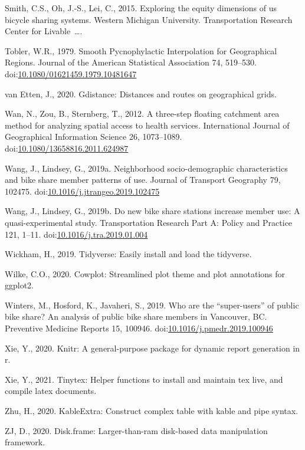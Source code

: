 \documentclass[]{elsarticle} %
\begin{document}
\leavevmode\hypertarget{ref-smith2015exploring}{}%
Smith, C.S., Oh, J.-S., Lei, C., 2015. Exploring the equity dimensions
of us bicycle sharing systems. Western Michigan University.
Transportation Research Center for Livable~\ldots.

\leavevmode\hypertarget{ref-toblerSmoothPycnophylacticInterpolation1979}{}%
Tobler, W.R., 1979. Smooth Pycnophylactic Interpolation for Geographical
Regions. Journal of the American Statistical Association 74, 519--530.
doi:\href{https://doi.org/10.1080/01621459.1979.10481647}{10.1080/01621459.1979.10481647}

\leavevmode\hypertarget{ref-R-gdistance}{}%
van Etten, J., 2020. Gdistance: Distances and routes on geographical
grids.

\leavevmode\hypertarget{ref-wanThreestepFloatingCatchment2012}{}%
Wan, N., Zou, B., Sternberg, T., 2012. A three-step floating catchment
area method for analyzing spatial access to health services.
International Journal of Geographical Information Science 26,
1073--1089.
doi:\href{https://doi.org/10.1080/13658816.2011.624987}{10.1080/13658816.2011.624987}

\leavevmode\hypertarget{ref-wangNeighborhoodSociodemographicCharacteristics2019}{}%
Wang, J., Lindsey, G., 2019a. Neighborhood socio-demographic
characteristics and bike share member patterns of use. Journal of
Transport Geography 79, 102475.
doi:\href{https://doi.org/10.1016/j.jtrangeo.2019.102475}{10.1016/j.jtrangeo.2019.102475}

\leavevmode\hypertarget{ref-wangNewBikeShare2019}{}%
Wang, J., Lindsey, G., 2019b. Do new bike share stations increase member
use: A quasi-experimental study. Transportation Research Part A: Policy
and Practice 121, 1--11.
doi:\href{https://doi.org/10.1016/j.tra.2019.01.004}{10.1016/j.tra.2019.01.004}

\leavevmode\hypertarget{ref-R-tidyverse}{}%
Wickham, H., 2019. Tidyverse: Easily install and load the tidyverse.

\leavevmode\hypertarget{ref-R-cowplot}{}%
Wilke, C.O., 2020. Cowplot: Streamlined plot theme and plot annotations
for ggplot2.

\leavevmode\hypertarget{ref-wintersWhoAreSuperusers2019}{}%
Winters, M., Hosford, K., Javaheri, S., 2019. Who are the
``super-users'' of public bike share? An analysis of public bike share
members in Vancouver, BC. Preventive Medicine Reports 15, 100946.
doi:\href{https://doi.org/10.1016/j.pmedr.2019.100946}{10.1016/j.pmedr.2019.100946}

\leavevmode\hypertarget{ref-R-knitr}{}%
Xie, Y., 2020. Knitr: A general-purpose package for dynamic report
generation in r.

\leavevmode\hypertarget{ref-R-tinytex}{}%
Xie, Y., 2021. Tinytex: Helper functions to install and maintain tex
live, and compile latex documents.

\leavevmode\hypertarget{ref-R-kableExtra}{}%
Zhu, H., 2020. KableExtra: Construct complex table with kable and pipe
syntax.

\leavevmode\hypertarget{ref-R-disk.frame}{}%
ZJ, D., 2020. Disk.frame: Larger-than-ram disk-based data manipulation
framework.
\end{document}
